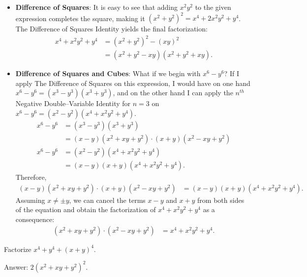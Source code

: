 \begin{solution}[name=Solution by Sophie Parker]

\begin{itemize}
    \item \textbf{Difference of Squares}: It is easy to see that adding $x^2y^2$ to the given expression completes the square, making it
    $(x^2+y^2)^2 = x^4+2x^2y^2+y^4$. The Difference of Squares Identity yields the final factorization:
    \begin{align*}
        x^4+x^2y^2+y^4 &= (x^2+y^2)^2 - (xy)^2\\ &=(x^2+y^2-xy)(x^2+y^2+xy).
    \end{align*}
    
    \item \textbf{Difference of Squares and Cubes}: What if we begin with $x^6-y^6$? If I apply The Difference of Squares on this expression, I would have on one hand $x^6-y^6=(x^3-y^3)(x^3+y^3)$, and on the other hand I can apply the $n^{th}$ Negative Double--Variable Identity for $n=3$ on $x^6-y^6= (x^2-y^2)(x^4+x^2y^2+y^4)$.
    \begin{align*}
        x^6 - y^6 &= (x^3-y^3)(x^3+y^3)\\
                  &= (x-y)(x^2+xy+y^2)\cdot (x+y)(x^2-xy+y^2)\\
        x^6 - y^6 &= (x^2-y^2)(x^4+x^2y^2+y^4)\\
                  &= (x-y)(x+y)(x^4+x^2y^2+y^4).
    \end{align*}
    Therefore,
    \begin{align*}
        (x-y)(x^2+xy+y^2)\cdot (x+y)(x^2-xy+y^2) &= (x-y)(x+y)(x^4+x^2y^2+y^4).
    \end{align*}
    Assuming $x\neq \pm y$, we can cancel the terms $x-y$ and $x+y$ from both sides of the equation and obtain the factorization of $x^4+x^2y^2+y^4$ as a consequence:
    \begin{align*}
        (x^2+xy+y^2)\cdot(x^2-xy+y^2) &= x^4+x^2y^2+y^4.
    \end{align*}
\end{itemize}
\end{solution}


\begin{tcolorbox}
\begin{question}
Factorize $x^4+y^4+(x+y)^4$.
\end{question}
\end{tcolorbox}

\begin{solution}
Answer: $2(x^2+xy+y^2)^2$.
\end{solution}



